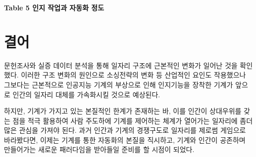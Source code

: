 \documentclass[smallextended]{svjour3}       %
\begin{document}
\textbf{Table 5 인지 작업과 자동화 정도}

\hypertarget{conclusion}{%
\section{결어}\label{conclusion}}

문헌조사와 실증 데이터 분석을 통해 일자리 구조에 근본적인 변화가 일어난
것을 확인했다. 이러한 구조 변화의 원인으로 소싱전략의 변화 등 산업적인
요인도 작용했으나 그보다는 근본적으로 인공지능 기계의 부상으로 인해
인지기능을 장착한 기계가 앞으로 인간의 일자리 대체를 가속화시킬 것으로
예상된다.

하지만, 기계가 가지고 있는 본질적인 한계가 존재하는 바, 이를 인간이
상대우위를 갖는 점을 적극 활용하여 사람 주도하에 기계를 제어하는 체계가
열어가는 일자리에 좀더 많은 관심을 가져야 된다. 과거 인간과 기계의
경쟁구도로 일자리를 제로썸 게임으로 바라봤다면, 이제는 기계를 통한
자동화의 본질을 직시하고, 기계와 인간이 공존하며 만들어가는 새로운
패러다임을 받아들일 준비를 할 시점이 되었다.



\end{document}
